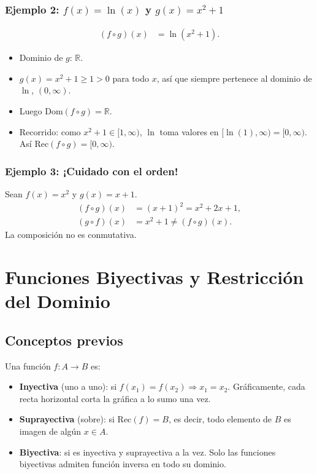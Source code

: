 \documentclass[12pt,a4paper]{article}
\newcommand{\Dominio}{\ensuremath{\mathrm{Dom}}}
\newcommand{\Recorrido}{\ensuremath{\mathrm{Rec}}}
\begin{document}
\subsubsection{Ejemplo 2: $f(x)=\ln(x)$ y $g(x)=x^2+1$}
\begin{align*}
    (f\circ g)(x) &= \ln(x^2+1).
\end{align*}
\begin{itemize}
    \item Dominio de $g$: $\mathbb{R}$.
    \item $g(x)=x^2+1 \geq 1 > 0$ para todo $x$, así que siempre pertenece al dominio de $\ln$, $(0,\infty)$.
    \item Luego $\Dominio(f\circ g)=\mathbb{R}$.
    \item Recorrido: como $x^2+1 \in [1,\infty)$, $\ln$ toma valores en $[\ln(1),\infty)=[0,\infty)$. Así $\Recorrido(f\circ g)=[0,\infty)$.
\end{itemize}

\subsubsection{Ejemplo 3: ¡Cuidado con el orden!}
Sean $f(x)=x^2$ y $g(x)=x+1$.
\begin{align*}
    (f\circ g)(x) &= (x+1)^2 = x^2+2x+1, \\
    (g\circ f)(x) &= x^2+1 \neq (f\circ g)(x).
\end{align*}
La composición no es conmutativa.

\section{Funciones Biyectivas y Restricción del Dominio}

\subsection{Conceptos previos}
Una función $f:A\to B$ es:
\begin{itemize}
    \item \textbf{Inyectiva} (uno a uno): si $f(x_1)=f(x_2) \Rightarrow x_1=x_2$. Gráficamente, cada recta horizontal corta la gráfica a lo sumo una vez.
    \item \textbf{Suprayectiva} (sobre): si $\Recorrido(f)=B$, es decir, todo elemento de $B$ es imagen de algún $x\in A$.
    \item \textbf{Biyectiva}: si es inyectiva y suprayectiva a la vez. Solo las funciones biyectivas admiten función inversa en todo su dominio.
\end{itemize}
\end{document}
